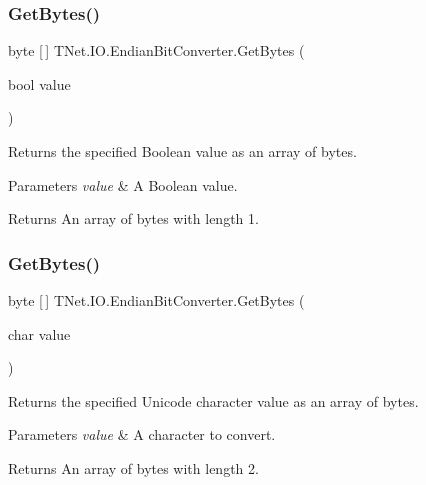 \subsubsection{\texorpdfstring{Get\+Bytes()}{GetBytes()}\hspace{0.1cm}{\footnotesize\ttfamily [2/11]}}
{\footnotesize\ttfamily byte \mbox{[}$\,$\mbox{]} T\+Net.\+I\+O.\+Endian\+Bit\+Converter.\+Get\+Bytes (\begin{DoxyParamCaption}\item[{bool}]{value }\end{DoxyParamCaption})}



Returns the specified Boolean value as an array of bytes. 


\begin{DoxyParams}{Parameters}
{\em value} & A Boolean value.\\
\hline
\end{DoxyParams}
\begin{DoxyReturn}{Returns}
An array of bytes with length 1.
\end{DoxyReturn}
\mbox{\label{class_t_net_1_1_i_o_1_1_endian_bit_converter_ac0bf5270842f7892896cfb842d4eee6a}} 
\subsubsection{\texorpdfstring{Get\+Bytes()}{GetBytes()}\hspace{0.1cm}{\footnotesize\ttfamily [3/11]}}
{\footnotesize\ttfamily byte \mbox{[}$\,$\mbox{]} T\+Net.\+I\+O.\+Endian\+Bit\+Converter.\+Get\+Bytes (\begin{DoxyParamCaption}\item[{char}]{value }\end{DoxyParamCaption})}



Returns the specified Unicode character value as an array of bytes. 


\begin{DoxyParams}{Parameters}
{\em value} & A character to convert.\\
\hline
\end{DoxyParams}
\begin{DoxyReturn}{Returns}
An array of bytes with length 2.
\end{DoxyReturn}
\mbox{\label{class_t_net_1_1_i_o_1_1_endian_bit_converter_a10b7358f3ab627c0376f5236c0165a3f}} 
